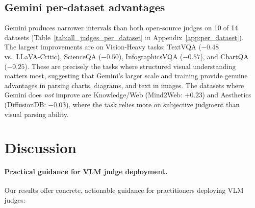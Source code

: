 \documentclass{article}
\begin{document}
\subsection{Gemini per-dataset advantages}
\label{sec:gemini_advantages}

Gemini produces narrower intervals than both open-source judges on 10 of 14 datasets (Table~\ref{tab:all_judges_per_dataset} in Appendix~\ref{app:per_dataset}). The largest improvements are on Vision-Heavy tasks: TextVQA ($-0.48$ vs.\ LLaVA-Critic), ScienceQA ($-0.50$), InfographicsVQA ($-0.57$), and ChartQA ($-0.25$). These are precisely the tasks where structured visual understanding matters most, suggesting that Gemini's larger scale and training provide genuine advantages in parsing charts, diagrams, and text in images. The datasets where Gemini does \emph{not} improve are Knowledge/Web (Mind2Web: $+0.23$) and Aesthetics (DiffusionDB: $-0.03$), where the task relies more on subjective judgment than visual parsing ability.

\section{Discussion}
\label{sec:discussion}

\paragraph{Practical guidance for VLM judge deployment.}
Our results offer concrete, actionable guidance for practitioners deploying VLM judges:
\end{document}
